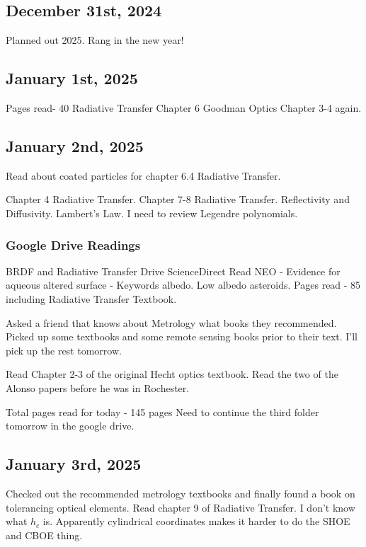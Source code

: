 \documentclass{article}
\begin{document}
\subsection{December 31st, 2024}
Planned out 2025. Rang in the new year! 


\subsection{January 1st, 2025}
Pages read- 40
Radiative Transfer Chapter 6 
Goodman Optics Chapter 3-4 again. 

\subsection{January 2nd, 2025}
Read about coated particles for chapter 6.4 Radiative Transfer.

Chapter 4 Radiative Transfer. 
Chapter 7-8 Radiative Transfer. Reflectivity and Diffusivity. Lambert's Law. I need to review Legendre polynomials. 

\subsubsection{Google Drive Readings}
BRDF and Radiative Transfer Drive ScienceDirect
Read NEO - Evidence for aqueous altered surface - Keywords albedo. Low albedo asteroids. 
Pages read - 85 including Radiative Transfer Textbook.

Asked a friend that knows about Metrology what books they recommended. Picked up some textbooks and some remote sensing books prior to their text. I'll pick up the rest tomorrow. 

Read Chapter 2-3 of the original Hecht optics textbook. Read the two of the Alonso papers before he was in Rochester. 

Total pages read for today - 145 pages
Need to continue the third folder tomorrow in the google drive. 


\subsection{January 3rd, 2025}
Checked out the recommended metrology textbooks and finally found a book on tolerancing optical elements. 
Read chapter 9 of Radiative Transfer. I don't know what $h_c$ is. Apparently cylindrical coordinates makes it harder to do the SHOE and CBOE thing. 
\end{document}
